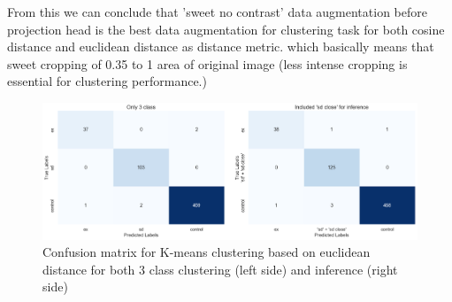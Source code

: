 From this we can conclude that 'sweet no contrast' data augmentation before projection head is the best data augmentation for clustering task for both cosine distance and euclidean distance as distance metric. which basically means that sweet cropping of 0.35 to 1 area of original image (less intense cropping is essential for clustering performance.)

\begin{table}[H]
    \centering
    \caption{Inference evaluation results on euclidean distance based on K-means}
    \label{tab:professional_table}
\end{table}


\begin{figure}[H]
    \centering
    \includegraphics[scale=0.37]{figures/econfuse.png} 
    \caption{Confusion matrix for K-means clustering based on euclidean distance for both 3 class clustering (left side) and inference (right side)}
    \label{fig:econfuse}
\end{figure}

